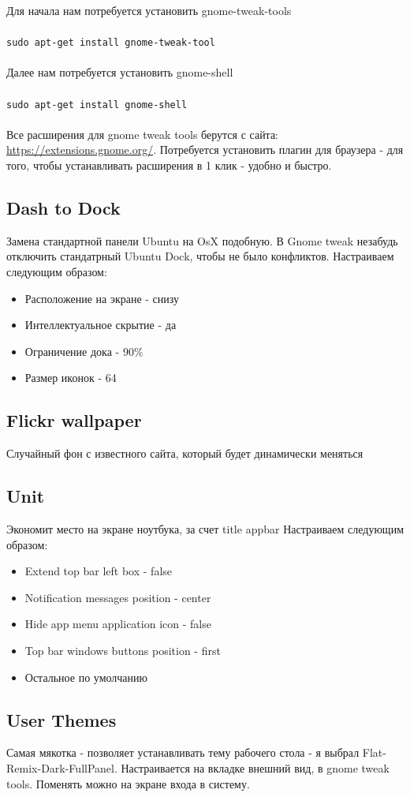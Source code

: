\documentclass[a4paper, 12pt]{report}
\begin{document}
Для начала нам потребуется установить gnome-tweak-tools
\\\\
\lstinline|sudo apt-get install gnome-tweak-tool|
\\\\
Далее нам потребуется установить gnome-shell
\\\\
\lstinline|sudo apt-get install gnome-shell|
\\\\
Все расширения для gnome tweak tools берутся с сайта: 
\href{https://extensions.gnome.org/}{https://extensions.gnome.org/}. Потребуется установить плагин для браузера - для того, чтобы устанавливать расширения в 1 клик - удобно и быстро.

\subsection{Dash to Dock} Замена стандартной панели Ubuntu на OsX подобную. В Gnome tweak незабудь отключить стандатрный Ubuntu Dock, чтобы не было конфликтов.
Настраиваем следующим образом:
\begin{itemize}
	\item Расположение на экране - снизу
	\item Интеллектуальное скрытие - да
	\item Ограничение дока - 90\%
	\item Размер иконок - 64
\end{itemize}

\subsection{Flickr wallpaper} Случайный фон с известного сайта, который будет динамически меняться

\subsection{Unit} Экономит место на экране ноутбука, за счет title appbar
Настраиваем следующим образом:
\begin{itemize}
	\item Extend top bar left box - false
	\item Notification messages position - center
	\item Hide app menu application icon - false
	\item Top bar windows buttons position - first
	\item Остальное по умолчанию
\end{itemize}

\subsection{User Themes} Самая мякотка - позволяет устанавливать тему рабочего стола - я выбрал Flat-Remix-Dark-FullPanel. Настраивается на вкладке внешний вид, в gnome tweak tools. Поменять можно на экране входа в систему.
\end{document}

